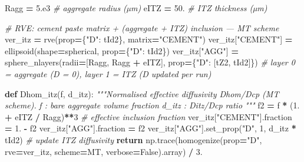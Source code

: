 \documentclass[
  a4paper,
  numbers=noendperiod,
  DIV=12]{scrreprt}
\newenvironment{Shaded}{\begin{snugshade}}{\end{snugshade}}
\newcommand{\CommentTok}[1]{\textcolor[rgb]{0.56,0.35,0.01}{\textit{#1}}}
\newcommand{\ControlFlowTok}[1]{\textcolor[rgb]{0.13,0.29,0.53}{\textbf{#1}}}
\newcommand{\DecValTok}[1]{\textcolor[rgb]{0.00,0.00,0.81}{#1}}
\newcommand{\FloatTok}[1]{\textcolor[rgb]{0.00,0.00,0.81}{#1}}
\newcommand{\KeywordTok}[1]{\textcolor[rgb]{0.13,0.29,0.53}{\textbf{#1}}}
\newcommand{\NormalTok}[1]{#1}
\newcommand{\OperatorTok}[1]{\textcolor[rgb]{0.81,0.36,0.00}{\textbf{#1}}}
\newcommand{\StringTok}[1]{\textcolor[rgb]{0.31,0.60,0.02}{#1}}
\newcommand{\VariableTok}[1]{\textcolor[rgb]{0.00,0.00,0.00}{#1}}
\begin{document}
\begin{Shaded}
\begin{Highlighting}[]
\NormalTok{Ragg }\OperatorTok{=} \FloatTok{5.e3}   \CommentTok{\# aggregate radius (µm)}
\NormalTok{eITZ }\OperatorTok{=} \FloatTok{50.}    \CommentTok{\# ITZ thickness (µm)}

\CommentTok{\# RVE: cement paste matrix + (aggregate + ITZ) inclusion — MT scheme}
\NormalTok{ver\_itz }\OperatorTok{=}\NormalTok{ rve(prop}\OperatorTok{=}\NormalTok{\{}\StringTok{"D"}\NormalTok{: tId2\}, matrix}\OperatorTok{=}\StringTok{"CEMENT"}\NormalTok{)}
\NormalTok{ver\_itz[}\StringTok{"CEMENT"}\NormalTok{] }\OperatorTok{=}\NormalTok{ ellipsoid(shape}\OperatorTok{=}\NormalTok{spherical, prop}\OperatorTok{=}\NormalTok{\{}\StringTok{"D"}\NormalTok{: tId2\})}
\NormalTok{ver\_itz[}\StringTok{"AGG"}\NormalTok{]    }\OperatorTok{=}\NormalTok{ sphere\_nlayers(radii}\OperatorTok{=}\NormalTok{[Ragg, Ragg }\OperatorTok{+}\NormalTok{ eITZ],}
\NormalTok{                                   prop}\OperatorTok{=}\NormalTok{\{}\StringTok{"D"}\NormalTok{: [tZ2, tId2]\})}
\CommentTok{\# layer 0 = aggregate (D = 0), layer 1 = ITZ (D updated per run)}

\KeywordTok{def}\NormalTok{ Dhom\_itz(f, d\_itz):}
    \CommentTok{"""Normalised effective diffusivity Dhom/Dcp (MT scheme).}
\CommentTok{    f     : bare aggregate volume fraction}
\CommentTok{    d\_itz : Ditz/Dcp ratio}
\CommentTok{    """}
\NormalTok{    f2 }\OperatorTok{=}\NormalTok{ f }\OperatorTok{*}\NormalTok{ (}\FloatTok{1.} \OperatorTok{+}\NormalTok{ eITZ }\OperatorTok{/}\NormalTok{ Ragg)}\OperatorTok{**}\DecValTok{3}        \CommentTok{\# effective inclusion fraction}
\NormalTok{    ver\_itz[}\StringTok{"CEMENT"}\NormalTok{].fraction }\OperatorTok{=} \FloatTok{1.} \OperatorTok{{-}}\NormalTok{ f2}
\NormalTok{    ver\_itz[}\StringTok{"AGG"}\NormalTok{].fraction    }\OperatorTok{=}\NormalTok{ f2}
\NormalTok{    ver\_itz[}\StringTok{"AGG"}\NormalTok{].set\_prop(}\StringTok{"D"}\NormalTok{, }\DecValTok{1}\NormalTok{, d\_itz }\OperatorTok{*}\NormalTok{ tId2)   }\CommentTok{\# update ITZ diffusivity}
    \ControlFlowTok{return}\NormalTok{ np.trace(homogenize(prop}\OperatorTok{=}\StringTok{"D"}\NormalTok{, rve}\OperatorTok{=}\NormalTok{ver\_itz,}
\NormalTok{                               scheme}\OperatorTok{=}\NormalTok{MT, verbose}\OperatorTok{=}\VariableTok{False}\NormalTok{).array) }\OperatorTok{/} \FloatTok{3.}
\end{Highlighting}
\end{Shaded}
\end{document}
